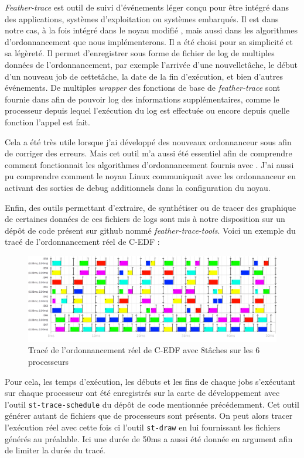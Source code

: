 \textit{Feather-trace} \cite{brandenburg2007feather} est outil de suivi d'événements léger conçu pour être intégré dans des applications,  systèmes d'exploitation ou systèmes embarqués. Il est dans notre cas, à la fois intégré dans le noyau modifié \litmus, mais aussi dans les algorithmes d'ordonnancement que nous implémenterons. Il a été choisi pour sa simplicité et sa légèreté. Il permet d'enregistrer sous forme de fichier de log de multiples données de l'ordonnancement, par exemple l'arrivée d'une nouvelletâche, le début d'un nouveau job de cettetâche, la date de la fin d'exécution, et bien d'autres événements. De multiples \textit{wrapper} des fonctions de base de \textit{feather-trace} sont fournie dans \litmus afin de pouvoir log des informations supplémentaires, comme le processeur depuis lequel l’exécution du log est effectuée ou encore depuis quelle fonction l'appel est fait.

Cela a été très utile lorsque j'ai développé des nouveaux ordonnanceur sous \litmus afin de corriger des erreurs. Mais cet outil m'a aussi été essentiel afin de comprendre comment fonctionnait les algorithmes d’ordonnancement fournis avec \litmus. J'ai aussi pu comprendre comment le noyau Linux communiquait avec les ordonnanceur en activant des sorties de debug additionnels dans la configuration du noyau.

Enfin, des outils permettant d'extraire, de synthétiser ou de tracer des graphique de certaines données de ces fichiers de logs sont mis à notre disposition sur un dépôt de code présent sur github nommé \textit{feather-trace-tools}. Voici un exemple du tracé de l'ordonnancement réel de C-EDF :


\begin{figure}[H]
     \centering
     \includegraphics[width=\textwidth]{Images/schedule_host=rock960_scheduler=C-EDF_trace=C-EDF-OFFSET.png}
     \caption{Tracé de l'ordonnancement réel de C-EDF avec 8tâches sur les 6 processeurs}
     \label{fig:trace-cedf}
\end{figure}


Pour cela, les temps d'exécution, les débuts et les fins de chaque jobs s'exécutant sur chaque processeur ont été enregistrés sur la carte de développement avec l'outil \texttt{st-trace-schedule} du dépôt de code mentionnée précédemment. Cet outil générer autant de fichiers que de processeurs sont présents. On peut alors tracer l’exécution réel avec cette fois ci l'outil \texttt{st-draw} en lui fournissant les fichiers générés au préalable. Ici une durée de 50ms a aussi été donnée en argument afin de limiter la durée du tracé.